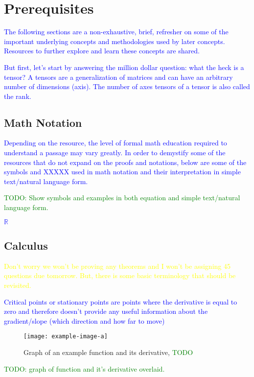 \chapter{Prerequisites}

\textcolor{blue}{The following sections are a non-exhaustive, brief, refresher on some of the important underlying concepts and methodologies used by later concepts. Resources to further explore and learn these concepts are shared.}

\textcolor{blue}{But first, let's start by answering the million dollar question: what the heck is a tensor?  A {tensors} are a generalization of matrices and can have an arbitrary number of dimensions (axis). The number of axes tensors of a tensor is also called the {rank}.}


\section{Math Notation}

\textcolor{blue}{Depending on the resource, the level of formal math education required to understand a passage may vary greatly. In order to demystify some of the resources that do not expand on the proofs and notations, below are some of the symbols and XXXXX used in math notation and their interpretation in simple text/natural language form.}

\textcolor{green}{TODO: Show symbols and examples in both equation and simple text/natural language form.}

\textcolor{blue}{$\mathbb{R}$}

\section{Calculus}

\textcolor{yellow}{Don't worry we won't be proving any theorems and I won't be assigning 45 questions due tomorrow. But, there is some basic terminology that should be revisited.}

\textcolor{blue}{{Critical points} or {stationary points} are points where the derivative is equal to zero and therefore doesn't provide any useful information about the gradient/slope (which direction and how far to move)}

\begin{figure}
	\centering
	\texttt{[image: example-image-a]}\hfil
	\caption{Graph of an example function and its derivative, \textcolor{green}{TODO}}
	\label{fig:calc_fn_deriv}
\end{figure}
\textcolor{green}{TODO: graph of function and it's derivative overlaid.}

